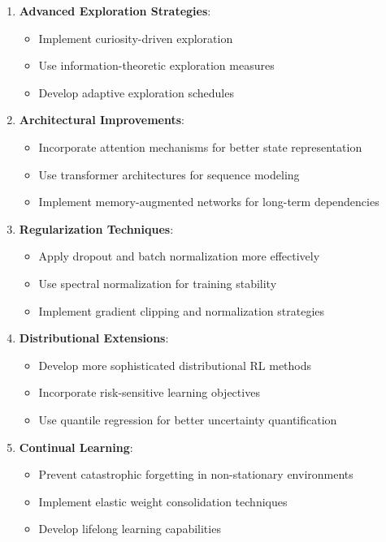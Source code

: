 \documentclass[12pt]{article}
\begin{document}
{{{\begin{enumerate}
    \item \textbf{Advanced Exploration Strategies}:
    \begin{itemize}
        \item Implement curiosity-driven exploration \cite{pathak2017curiosity}
        \item Use information-theoretic exploration measures
        \item Develop adaptive exploration schedules
    \end{itemize}
    
    \item \textbf{Architectural Improvements}:
    \begin{itemize}
        \item Incorporate attention mechanisms for better state representation
        \item Use transformer architectures for sequence modeling
        \item Implement memory-augmented networks for long-term dependencies
    \end{itemize}
    
    \item \textbf{Regularization Techniques}:
    \begin{itemize}
        \item Apply dropout and batch normalization more effectively
        \item Use spectral normalization for training stability
        \item Implement gradient clipping and normalization strategies
    \end{itemize}
    
    \item \textbf{Distributional Extensions}:
    \begin{itemize}
        \item Develop more sophisticated distributional RL methods
        \item Incorporate risk-sensitive learning objectives
        \item Use quantile regression for better uncertainty quantification
    \end{itemize}
    
    \item \textbf{Continual Learning}:
    \begin{itemize}
        \item Prevent catastrophic forgetting in non-stationary environments
        \item Implement elastic weight consolidation techniques
        \item Develop lifelong learning capabilities
    \end{itemize}
\end{enumerate}

}}}
\end{document}
